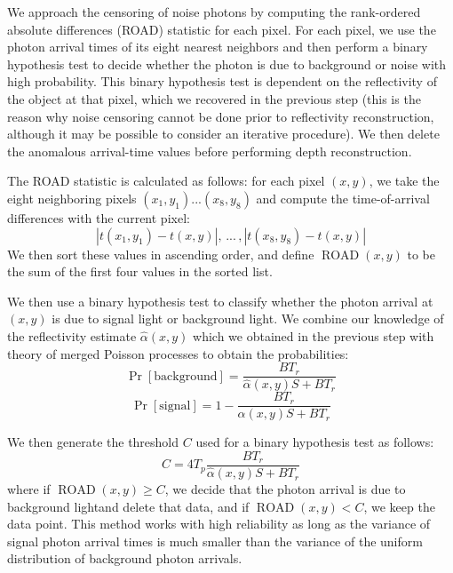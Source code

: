 We approach the censoring of noise photons by computing the rank-ordered absolute differences (ROAD) statistic \cite{garnett-universal} for each pixel. For each pixel, we use the photon arrival times of its eight nearest neighbors and then perform a binary hypothesis test to decide whether the photon is due to background or noise with high probability. This binary hypothesis test is dependent on the reflectivity of the object at that pixel, which we recovered in the previous step (this is the reason why noise censoring cannot be done prior to reflectivity reconstruction, although it may be possible to consider an iterative procedure). We then delete the anomalous arrival-time values before performing depth reconstruction.

The ROAD statistic is calculated as follows: for each pixel $(x,y)$, we take the eight neighboring pixels $(x_1,y_1) ... (x_8,y_8)$ and compute the time-of-arrival differences with the current pixel:
\begin{equation}
|t(x_1,y_1) - t(x,y)| , \, ... \, , |t(x_8,y_8) - t(x,y)|
\end{equation}
We then sort these values in ascending order, and define $\operatorname{ROAD}(x,y)$ to be the sum of the first four values in the sorted list.

We then use a binary hypothesis test to classify whether the photon arrival at $(x,y)$ is due to signal light or background light. We combine our knowledge of the reflectivity estimate $\hat{\alpha}(x,y)$ which we obtained in the previous step with theory of merged Poisson processes \cite{bertsekas-introduction} to obtain the probabilities:
\begin{equation}
\operatorname{Pr}[\mathrm{background}] = \frac{BT_r}{\hat{\alpha}(x,y)S + BT_r}
\end{equation}
\begin{equation}
\operatorname{Pr}[\mathrm{signal}] = 1 - \frac{BT_r}{\hat{\alpha}(x,y)S + BT_r}
\end{equation}

We then generate the threshold $C$ used for a binary hypothesis test as follows:
\begin{equation}
C = 4T_p \frac{ BT_r }{\hat{\alpha}(x,y)S + BT_r}
\end{equation}
where if $\operatorname{ROAD}(x,y) \geq C$, we decide that the photon arrival is due to background lightand delete that data, and if $\operatorname{ROAD}(x,y) < C$, we keep the data point. This method works with high reliability \cite{garnett-universal} as long as the variance of signal photon arrival times is much smaller than the variance of the uniform distribution of background photon arrivals.

